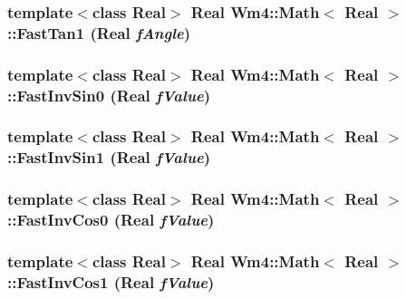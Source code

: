 \subsubsection{\setlength{\rightskip}{0pt plus 5cm}template$<$class Real$>$ Real {\bf Wm4::Math}$<$ Real $>$::Fast\-Tan1 (Real {\em f\-Angle})\hspace{0.3cm}{\tt  [static]}}\label{classWm4_1_1Math_ae6316c29815e109aeb9194773811789}


\subsubsection{\setlength{\rightskip}{0pt plus 5cm}template$<$class Real$>$ Real {\bf Wm4::Math}$<$ Real $>$::Fast\-Inv\-Sin0 (Real {\em f\-Value})\hspace{0.3cm}{\tt  [static]}}\label{classWm4_1_1Math_f2b501ba906fb31c3dade17977003352}


\subsubsection{\setlength{\rightskip}{0pt plus 5cm}template$<$class Real$>$ Real {\bf Wm4::Math}$<$ Real $>$::Fast\-Inv\-Sin1 (Real {\em f\-Value})\hspace{0.3cm}{\tt  [static]}}\label{classWm4_1_1Math_c5cb2393220d2670af98e35ef6f00dd5}


\subsubsection{\setlength{\rightskip}{0pt plus 5cm}template$<$class Real$>$ Real {\bf Wm4::Math}$<$ Real $>$::Fast\-Inv\-Cos0 (Real {\em f\-Value})\hspace{0.3cm}{\tt  [static]}}\label{classWm4_1_1Math_32a199184eb80a9d5375bda93d926f15}


\subsubsection{\setlength{\rightskip}{0pt plus 5cm}template$<$class Real$>$ Real {\bf Wm4::Math}$<$ Real $>$::Fast\-Inv\-Cos1 (Real {\em f\-Value})\hspace{0.3cm}{\tt  [static]}}\label{classWm4_1_1Math_3f7614e98c6c9f5bd7d2b69fcb5584a1}


